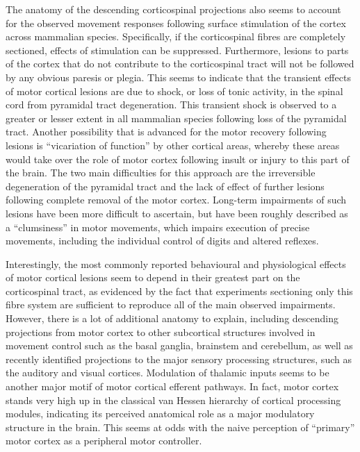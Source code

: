 The anatomy of the descending corticospinal projections also seems to account for the observed movement responses following surface stimulation of the cortex across mammalian species. Specifically, if the corticospinal fibres are completely sectioned, effects of stimulation can be suppressed. Furthermore, lesions to parts of the cortex that do not contribute to the corticospinal tract will not be followed by any obvious paresis or plegia. This seems to indicate that the transient effects of motor cortical lesions are due to shock, or loss of tonic activity, in the spinal cord from pyramidal tract degeneration. This transient shock is observed to a greater or lesser extent in all mammalian species following loss of the pyramidal tract. Another possibility that is advanced for the motor recovery following lesions is ``vicariation of function'' by other cortical areas, whereby these areas would take over the role of motor cortex following insult or injury to this part of the brain. The two main difficulties for this approach are the irreversible degeneration of the pyramidal tract and the lack of effect of further lesions following complete removal of the motor cortex. Long-term impairments of such lesions have been more difficult to ascertain, but have been roughly described as a ``clumsiness'' in motor movements, which impairs execution of precise movements, including the individual control of digits and altered reflexes.

Interestingly, the most commonly reported behavioural and physiological effects of motor cortical lesions seem to depend in their greatest part on the corticospinal tract, as evidenced by the fact that experiments sectioning only this fibre system are sufficient to reproduce all of the main observed impairments. However, there is a lot of additional anatomy to explain, including descending projections from motor cortex to other subcortical structures involved in movement control such as the basal ganglia, brainstem and cerebellum, as well as recently identified projections to the major sensory processing structures, such as the auditory and visual cortices. Modulation of thalamic inputs seems to be another major motif of motor cortical efferent pathways. In fact, motor cortex stands very high up in the classical van Hessen hierarchy of cortical processing modules, indicating its perceived anatomical role as a major modulatory structure in the brain. This seems at odds with the naive perception of ``primary'' motor cortex as a peripheral motor controller.

